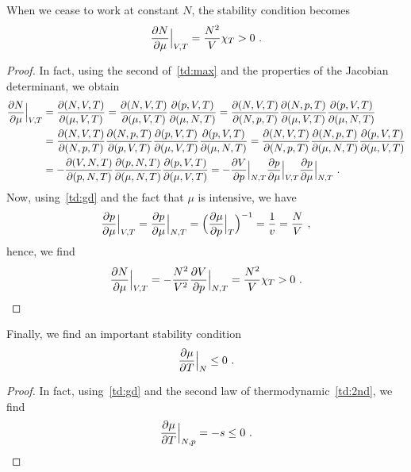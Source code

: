     When we cease to work at constant $N$, the stability condition becomes
    \begin{equation*}
        \frac{\partial N}{\partial\mu} \Big \vert_{V, T} = \frac{N^2}{V} \chi_T > 0 ~.
    \end{equation*}
    \begin{proof}
        In fact, using the second of~\eqref{td:max} and the properties of the Jacobian determinant, we obtain
        \begin{equation*}
        \begin{aligned}
            \frac{\partial N}{\partial\mu} \Big \vert_{V, T} & = \frac{\partial(N, V, T)}{\partial(\mu, V, T)} = \frac{\partial(N, V, T)}{\partial(\mu, V, T)} \frac{\partial(p, V, T)}{\partial(\mu, N, T)} = \frac{\partial(N, V, T)}{\partial(N, p, T)}\frac{\partial(N, p, T)}{\partial(\mu, V, T)} \frac{\partial(p, V, T)}{\partial(\mu, N, T)} \\ & = \frac{\partial(N, V, T)}{\partial(N, p, T)} \frac{\partial(N, p, T)}{\partial(p, V, T)} \frac{\partial(p, V, T)}{\partial(\mu, V, T)} \frac{\partial(p, V, T)}{\partial(\mu, N, T)} = \frac{\partial(N, V, T)}{\partial(N, p, T)} \frac{\partial(N, p, T)}{\partial(\mu, N, T)} \frac{\partial(p, V, T)}{\partial(\mu, V, T)} \\ & = - \frac{\partial(V, N, T)}{\partial(p, N, T)} \frac{\partial(p, N, T)}{\partial(\mu, N, T)} \frac{\partial(p, V, T)}{\partial(\mu, V, T)} = - \frac{\partial V}{\partial p} \Big \vert_{N, T}  \frac{\partial p}{\partial\mu} \Big \vert_{V, T} \frac{\partial p}{\partial\mu} \Big \vert_{N, T} ~.
        \end{aligned}
        \end{equation*}
        Now, using~\eqref{td:gd} and the fact that $\mu$ is intensive, we have
        \begin{equation*}
            \frac{\partial p}{\partial\mu} \Big \vert_{V, T} = \frac{\partial p}{\partial\mu} \Big \vert_{N, T} = \Big ( \frac{\partial\mu}{\partial p} \Big \vert_T \Big)^{-1} = \frac{1}{v} = \frac{N}{V} ~,
        \end{equation*}
        hence, we find
        \begin{equation*}
        \frac{\partial N}{\partial\mu} \Big \vert_{V, T} = - \frac{N^2}{V^2} \frac{\partial V}{\partial p} \Big \vert_{N,T} = \frac{N^2}{V} \chi_T > 0 ~.
        \end{equation*}
    \end{proof}

    Finally, we find an important stability condition
    \begin{equation}\label{td:muT}
        \frac{\partial\mu}{\partial T} \Big \vert_N \leq 0 ~.
    \end{equation}
    \begin{proof}
        In fact, using~\eqref{td:gd} and the second law of thermodynamic~\eqref{td:2nd}, we find 
        \begin{equation*}
            \frac{\partial\mu}{\partial T} \Big \vert_{N, p} = - s \leq 0 ~.
        \end{equation*}
    \end{proof}

    